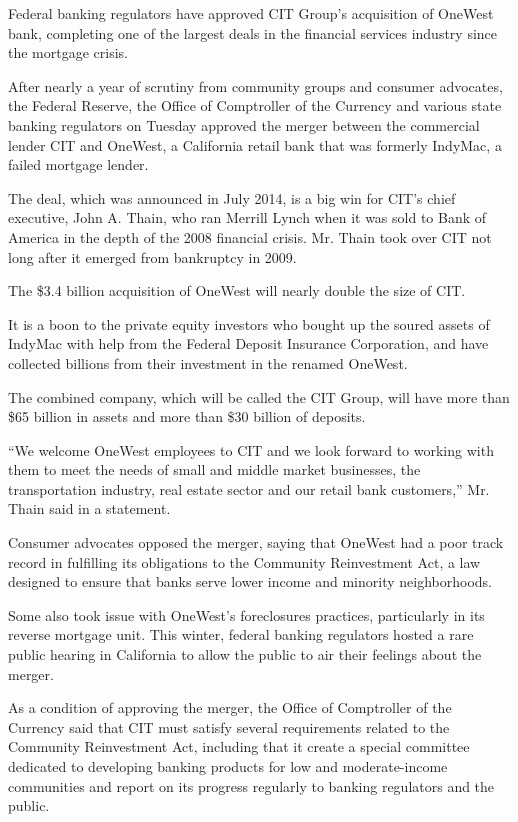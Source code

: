 Federal banking regulators have approved CIT Group's acquisition of
OneWest bank, completing one of the largest deals in the financial
services industry since the mortgage crisis.

After nearly a year of scrutiny from community groups and consumer
advocates, the Federal Reserve, the Office of Comptroller of the
Currency and various state banking regulators on Tuesday approved the
merger between the commercial lender CIT and OneWest, a California
retail bank that was formerly IndyMac, a failed mortgage lender.

The deal, which was announced in July 2014, is a big win for CIT's chief
executive, John A. Thain, who ran Merrill Lynch when it was sold to Bank
of America in the depth of the 2008 financial crisis. Mr. Thain took
over CIT not long after it emerged from bankruptcy in 2009.

The \$3.4 billion acquisition of OneWest will nearly double the size of
CIT.

It is a boon to the private equity investors who bought up the soured
assets of IndyMac with help from the Federal Deposit Insurance
Corporation, and have collected billions from their investment in the
renamed OneWest.

The combined company, which will be called the CIT Group, will have more
than \$65 billion in assets and more than \$30 billion of deposits.

``We welcome OneWest employees to CIT and we look forward to working
with them to meet the needs of small and middle market businesses, the
transportation industry, real estate sector and our retail bank
customers,'' Mr. Thain said in a statement.

Consumer advocates opposed the merger, saying that OneWest had a poor
track record in fulfilling its obligations to the Community Reinvestment
Act, a law designed to ensure that banks serve lower income and minority
neighborhoods.

Some also took issue with OneWest's foreclosures practices, particularly
in its reverse mortgage unit. This winter, federal banking regulators
hosted a rare public hearing in California to allow the public to air
their feelings about the merger.

As a condition of approving the merger, the Office of Comptroller of the
Currency said that CIT must satisfy several requirements related to the
Community Reinvestment Act, including that it create a special committee
dedicated to developing banking products for low and moderate-income
communities and report on its progress regularly to banking regulators
and the public.

